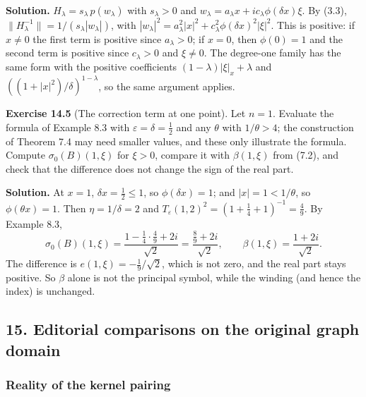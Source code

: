 \documentclass[
  11pt,
]{article}
\begin{document}
\textbf{Solution.} \(H_\lambda=s_\lambda\,p(w_\lambda)\) with
\(s_\lambda>0\) and
\(w_\lambda=a_\lambda x+ic_\lambda\phi(\delta x)\xi\). By (3.3),
\(\|H_\lambda^{-1}\|=1/(s_\lambda|w_\lambda|)\), with
\(|w_\lambda|^2=a_\lambda^2|x|^2+c_\lambda^2\phi(\delta x)^2|\xi|^2\).
This is positive: if \(x\ne0\) the first term is positive since
\(a_\lambda>0\); if \(x=0\), then \(\phi(0)=1\) and the second term is
positive since \(c_\lambda>0\) and \(\xi\ne0\). The degree-one family
has the same form with the positive coefficients
\((1-\lambda)|\xi|_x+\lambda\) and \(((1+|x|^2)/\delta)^{1-\lambda}\),
so the same argument applies.

\textbf{Exercise 14.5} (The correction term at one point). Let \(n=1\).
Evaluate the formula of Example 8.3 with \(\varepsilon=\delta=\tfrac12\)
and any \(\theta\) with \(1/\theta>4\); the construction of Theorem 7.4
may need smaller values, and these only illustrate the formula. Compute
\(\sigma_0(B)(1,\xi)\) for \(\xi>0\), compare it with \(\beta(1,\xi)\)
from (7.2), and check that the difference does not change the sign of
the real part.

\textbf{Solution.} At \(x=1\), \(\delta x=\tfrac12\le1\), so
\(\phi(\delta x)=1\); and \(|x|=1<1/\theta\), so \(\phi(\theta x)=1\).
Then \(\eta=1/\delta=2\) and
\(T_\varepsilon(1,2)^2=(1+\tfrac14+1)^{-1}=\tfrac49\). By Example 8.3,
\[
\sigma_0(B)(1,\xi)=\frac{1-\tfrac14\cdot\tfrac49+2i}{\sqrt2}=\frac{\tfrac89+2i}{\sqrt2},\qquad \beta(1,\xi)=\frac{1+2i}{\sqrt2}.
\] The difference is \(e(1,\xi)=-\tfrac19/\sqrt2\), which is not zero,
and the real part stays positive. So \(\beta\) alone is not the
principal symbol, while the winding (and hence the index) is unchanged.

\subsection{15. Editorial comparisons on the original graph
domain}\label{editorial-comparisons-on-the-original-graph-domain}

\subsubsection{Reality of the kernel
pairing}\label{reality-of-the-kernel-pairing}
\end{document}
